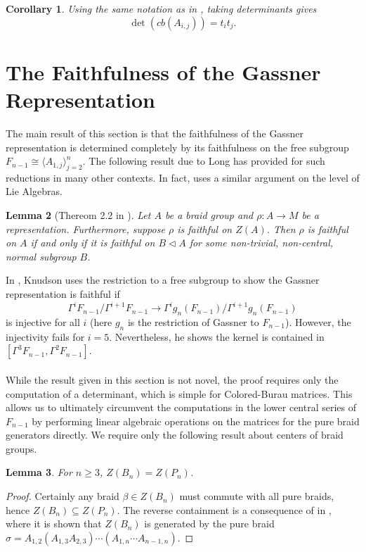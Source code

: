 \documentclass[11pt]{article}
\newtheorem{lemma}{Lemma}[section]
\newtheorem{corollary}[lemma]{Corollary}
\begin{document}
\begin{corollary}\label{cor:det}
	Using the same notation as in , taking determinants gives
		$$\det(cb(A_{i,j}))=t_it_j.$$
\end{corollary}

\section{The Faithfulness of the Gassner Representation}\label{sec:lipschutz}
The main result of this section is that the faithfulness of the Gassner representation is determined completely by its faithfulness on the free subgroup $F_{n-1}\cong \langle A_{1,j}\rangle_{j=2}^n$. The following result due to Long has provided for such reductions in many other contexts. In fact, \cite{cp} uses a similar argument on the level of Lie Algebras.

\begin{lemma}[Thereom 2.2 in \cite{lng}]\label{lem:faith-redux}
	Let $A$ be a braid group and $\rho:A\to M$ be a representation. Furthermore, suppose $\rho$
	is faithful on $Z(A)$. Then $\rho$ is faithful on $A$ if and only if it is faithful on 
	$B\lhd A$ for some non-trivial, non-central, normal subgroup $B$.
\end{lemma}

\noindent In \cite{knudson}, Knudson uses the restriction to a free subgroup to show the Gassner representation is faithful if
$$\Gamma^iF_{n-1}/\Gamma^{i+1}F_{n-1}\to\Gamma^ig_n(F_{n-1})/\Gamma^{i+1}g_n(F_{n-1})$$ 
is injective for all $i$ (here $g_n$ is the restriction of Gassner to $F_{n-1}$). However, the injectivity fails for $i=5$. Nevertheless, he shows the kernel is contained in $[\Gamma^3F_{n-1},\Gamma^2F_{n-1}]$. 
\\
\\
While the result given in this section is not novel, the proof requires only the computation of a determinant, which is simple for Colored-Burau matrices. This allows us to ultimately circumvent the computations in the lower central series of $F_{n-1}$ by performing linear algebraic operations on the matrices for the pure braid generators directly. We require only the following result about centers of braid groups. 

\begin{lemma}\label{lem:zpn=zbn}
	For $n\geq 3$, $Z(B_n)=Z(P_n)$.
\end{lemma}

\begin{proof}
	Certainly any braid $\beta\in Z(B_n)$ must commute with all pure braids, hence 
	$Z(B_n)\subseteq Z(P_n)$. The reverse containment is a consequence of in \cite[Corollary 1.8.4]{Birm},
	where it is shown that $Z(B_n)$ is generated by the pure braid 
	$\sigma =A_{1,2}(A_{1,3}A_{2,3})\cdots(A_{1,n}\cdots A_{n-1,n})$.
\end{proof}
\end{document}
